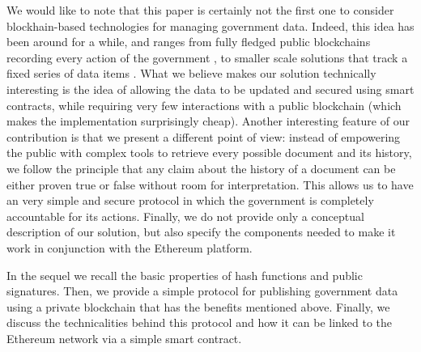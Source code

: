 We would like to note that this paper is certainly not the first one to consider blockhain-based technologies for managing government data. Indeed, this idea has been around for a while, and ranges from fully fledged public blockchains recording every action of the government \cite{eushit,ibmshit}, to smaller scale solutions that track a fixed series of data items \cite{energiaabierta}. What we believe makes our solution technically interesting is the idea of allowing the data to be updated and secured using smart contracts, while requiring very few interactions with a public blockchain (which makes the implementation surprisingly cheap). Another interesting feature of our contribution is that we present a different point of view: instead of empowering the public with complex tools to retrieve every possible document and its history, we follow the principle that any claim about the history of a document can be either proven true or false without room for interpretation. This allows us to have an very simple and secure protocol in which the government is completely accountable for its actions. Finally, we do not provide only a conceptual description of our solution, but also specify the components needed to make it work in conjunction with the Ethereum platform.

In the sequel we recall the basic properties of hash functions and public signatures. Then, we provide a simple protocol for publishing government data using a private blockchain that has the benefits mentioned above. Finally, we discuss the technicalities behind this protocol and how it can be linked to the Ethereum network via a simple smart contract.

